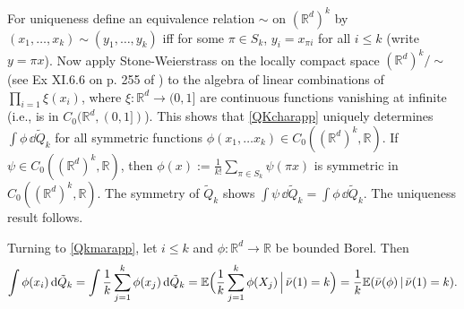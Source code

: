 \documentclass[12pt]{article}
\makeatletter
\renewenvironment{proof}[1][\proofname]{%
\par\pushQED{\qed}\normalfont%
\topsep6\p@\@plus6\p@\relax
\trivlist\item[\hskip\labelsep\bfseries#1\@addpunct{.}]%
\ignorespaces
}{%
\popQED\endtrivlist\@endpefalse
}
\numberwithin{theorem}{section}
\theoremstyle{def}
\numberwithin{equation}{section}
\newcommand{\E}{\mathbb{E}}
\newcommand{\R}{\mathbb{R}}
\makeatother
\begin{document}
{\begin{proof}
For uniqueness define an equivalence relation $\sim$ on $(\R^d)^k$ by $(x_1,\dots,x_k)\sim(y_1,\dots,y_k)$ iff for some $\pi\in S_k$, $y_i=x_{\pi i}$ for all $i\le k$ (write $y=\pi x$).  
Now apply Stone-Weierstrass on the locally compact space $(\R^d)^k/\sim$ (see Ex XI.6.6 on p. 255 of \cite{Dug}) to the algebra of linear combinations of $\prod_{i=1}\xi(x_i)$, where $\xi:\R^d\to(0,1]$ are continuous functions vanishing at infinite (i.e., is in $C_0(\R^d,(0,1])$). 
This shows that \eqref{QKcharapp} uniquely determines $\int\phi\, \dd \tilde Q_k$ for all symmetric functions $\phi(x_1,\dots x_k)\in C_0((\R^d)^k,\R)$. If $\psi\in C_0((\R^d)^k,\R)$, then $\phi(x):=\frac{1}{k!}\sum_{\pi\in S_k}\psi(\pi x)$ is symmetric in $C_0((\R^d)^k,\R)$.  
The symmetry of $\tilde Q_k$ shows $\int \psi\,\dd \tilde Q_k=\int \phi\,\dd \tilde Q_k$. 
The uniqueness result follows.
	
Turning to \eqref{Qkmarapp}, let $i\le k$ and $\phi:\R^d\to\R$ be bounded Borel. Then
	\begin{align*}
		\int\phi(x_i)\,\dd \tilde Q_k=\int \frac{1}{k}\sum_{j=1}^k\phi(x_j)\,\dd \tilde Q_k=\E\Bigl(\frac{1}{k}\sum_{j=1}^k\phi(X_j)\, \Bigl| \, \bar\nu(1)=k\Bigr)=\frac{1}{k}\E(\bar\nu(\phi) \, | \, \bar\nu(1)=k).
	\end{align*}
\end{proof}
}
\end{document}
